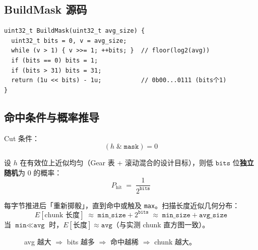 \subsection{BuildMask 源码}

\begin{corebox}
\begin{verbatim}
uint32_t BuildMask(uint32_t avg_size) {
  uint32_t bits = 0, v = avg_size;
  while (v > 1) { v >>= 1; ++bits; }  // floor(log2(avg))
  if (bits == 0) bits = 1;
  if (bits > 31) bits = 31;
  return (1u << bits) - 1u;           // 0b00...0111 (bits个1)
}
\end{verbatim}
\end{corebox}

\subsection{命中条件与概率推导}

Cut 条件：
\begin{equation}
  (h \;\&\; \texttt{mask}) = 0
  \label{eq:hit}
\end{equation}

设 $h$ 在有效位上近似均匀（Gear 表 + 滚动混合的设计目标），则低 $\texttt{bits}$ 位\textbf{独立随机}为 0 的概率：
\begin{equation}
  P_{\text{hit}} \;=\; \frac{1}{2^{\texttt{bits}}}
  \label{eq:phit}
\end{equation}

每字节推进后「重新掷骰」，直到命中或触及 \texttt{max}。扫描长度近似几何分布：
\begin{equation}
  E[\text{chunk 长度}] \;\approx\; \texttt{min\_size} + 2^{\texttt{bits}}
  \;\approx\; \texttt{min\_size} + \texttt{avg\_size}
  \label{eq:expected-len}
\end{equation}
当 $\texttt{min} \ll \texttt{avg}$ 时，$E[\text{长度}] \approx \texttt{avg}$（与实测 chunk 直方图一致）。

\begin{figure}[htbp]
\centering
{}
\caption{avg 越大 $\Rightarrow$ bits 越多 $\Rightarrow$ 命中越稀 $\Rightarrow$ chunk 越大。}
\label{fig:bits-bar}
\end{figure}

